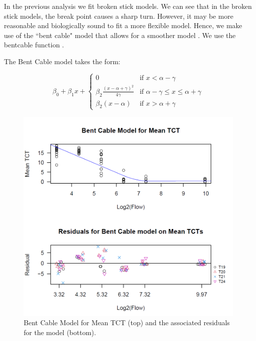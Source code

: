  In the previous analysis we fit broken stick models. We can see that in the broken stick models, the break point causes a sharp turn. However, it may be more reasonable and biologically sound to fit a more flexible model. Hence, we make use of the ``bent cable" model that allows for a smoother model \citep{bentcable}. We use the bentcable function \citep{bentcable2}.
 
 \vspace{5mm}
 
The Bent Cable model takes the form:
\vspace{5mm}


 $$ \beta_{0}+\beta_{1}x+ \begin{cases}
0  &  \text{if    } x < \alpha-\gamma \\[2ex]
\beta_{2}\frac{(x-\alpha+\gamma)^{2}}{4\gamma}  &  \text{if    } \alpha-\gamma  \le x \le \alpha+\gamma \\[2ex]
\beta_{2}(x-\alpha) & \text{if  } x > \alpha+\gamma
\end{cases}$$



\begin{figure}[H]
\includegraphics[scale=0.7]{Chapter4Images/meantctbentcable.png}
\caption{Bent Cable Model for Mean TCT (top) and the associated residuals for the model (bottom).}
\label{fig:meanbc}
\end{figure}





